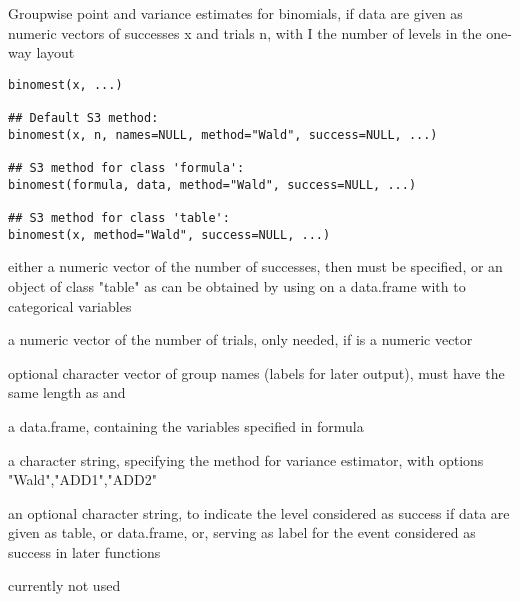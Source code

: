 \begin{Description}\relax
Groupwise point and variance estimates for binomials,
if data are given as numeric vectors of successes x and trials n,
with I the number of levels in the one-way layout
\end{Description}
\begin{Usage}
\begin{verbatim}
binomest(x, ...)

## Default S3 method:
binomest(x, n, names=NULL, method="Wald", success=NULL, ...)

## S3 method for class 'formula':
binomest(formula, data, method="Wald", success=NULL, ...)

## S3 method for class 'table':
binomest(x, method="Wald", success=NULL, ...)

\end{verbatim}
\end{Usage}
\begin{Arguments}
\begin{ldescription}
\item[\code{x}] either a numeric vector of the number of successes, then  must be specified,
or an object of class "table" as can be obtained by using  on a data.frame with to categorical variables 
\item[\code{n}] a numeric vector of the number of trials, only needed, if  is a numeric vector  
\item[\code{names}] optional character vector of group names (labels for later output), must have the same length as  and  
\item[\code{formula}] 
\item[\code{data}] a data.frame, containing the variables specified in formula
\item[\code{method}] a character string, specifying the method for variance estimator, with options "Wald","ADD1","ADD2" 
\item[\code{success}] an optional character string, to indicate the level considered as success if data are given as table, or data.frame, or, serving as label for the event considered as success in later functions
\item[\code{...}] currently not used
\end{ldescription}
\end{Arguments}
